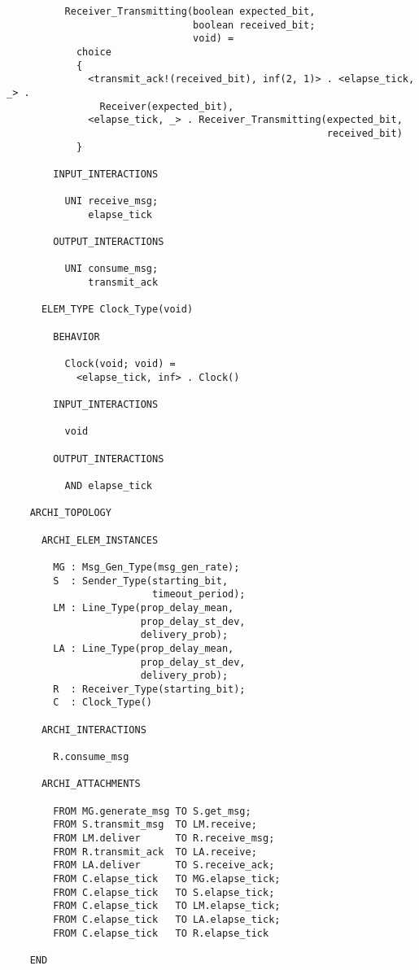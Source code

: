 \begin{verbatim}
          Receiver_Transmitting(boolean expected_bit,
                                boolean received_bit;
                                void) =
            choice
            {
              <transmit_ack!(received_bit), inf(2, 1)> . <elapse_tick, _> .
                Receiver(expected_bit),
              <elapse_tick, _> . Receiver_Transmitting(expected_bit,
                                                       received_bit)
            }

        INPUT_INTERACTIONS

          UNI receive_msg;
              elapse_tick

        OUTPUT_INTERACTIONS

          UNI consume_msg;
              transmit_ack

      ELEM_TYPE Clock_Type(void)

        BEHAVIOR

          Clock(void; void) =
            <elapse_tick, inf> . Clock()

        INPUT_INTERACTIONS

          void

        OUTPUT_INTERACTIONS

          AND elapse_tick

    ARCHI_TOPOLOGY

      ARCHI_ELEM_INSTANCES

        MG : Msg_Gen_Type(msg_gen_rate);
        S  : Sender_Type(starting_bit,
                         timeout_period);
        LM : Line_Type(prop_delay_mean,
                       prop_delay_st_dev,
                       delivery_prob);
        LA : Line_Type(prop_delay_mean,
                       prop_delay_st_dev,
                       delivery_prob);
        R  : Receiver_Type(starting_bit);
        C  : Clock_Type()

      ARCHI_INTERACTIONS

        R.consume_msg

      ARCHI_ATTACHMENTS

        FROM MG.generate_msg TO S.get_msg;
        FROM S.transmit_msg  TO LM.receive;
        FROM LM.deliver      TO R.receive_msg;
        FROM R.transmit_ack  TO LA.receive;
        FROM LA.deliver      TO S.receive_ack;
        FROM C.elapse_tick   TO MG.elapse_tick;
        FROM C.elapse_tick   TO S.elapse_tick;
        FROM C.elapse_tick   TO LM.elapse_tick;
        FROM C.elapse_tick   TO LA.elapse_tick;
        FROM C.elapse_tick   TO R.elapse_tick

    END
	\end{verbatim}

